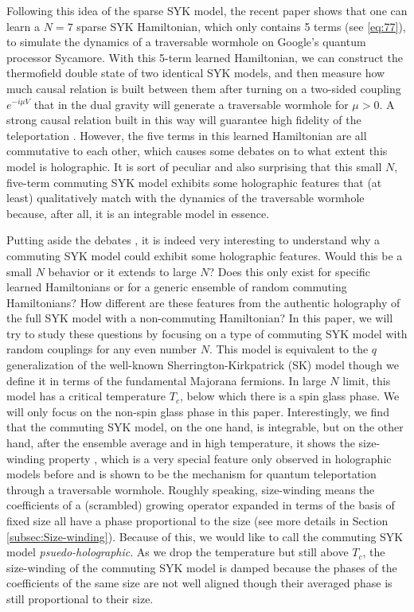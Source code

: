 \documentclass[11pt]{article}
\renewcommand{\>}{\rangle}
\newcommand{\<}{\langle}
\begin{document}
Following this idea of the sparse SYK model, the recent paper \cite{Jafferis:2022crx} shows that one can learn a $N=7$ sparse SYK Hamiltonian, which only contains 5 terms (see \eqref{eq:77}), to simulate the dynamics of a traversable wormhole on Google's quantum processor Sycamore. With this 5-term learned Hamiltonian, we can construct the thermofield double state of two identical SYK models, and then measure how much causal relation is built between them after turning on a two-sided coupling $e^{-i\mu V}$ that in the dual gravity will generate a traversable wormhole for $\mu>0$. A strong causal relation built in this way will guarantee high fidelity of the teleportation \cite{Gao:2019nyj}. However, the five terms in this learned Hamiltonian are all commutative to each other, which causes some debates \cite{Kobrin:2023rzr,Jafferis:2023moh} on to what extent this model is holographic. It is sort of peculiar and also surprising that this small $N$, five-term commuting SYK model exhibits some holographic features that (at least) qualitatively match with the dynamics of the traversable wormhole because, after all, it is an integrable model in essence.

Putting aside the debates \cite{Kobrin:2023rzr,Jafferis:2023moh}, it is indeed very interesting to understand why a commuting SYK model could exhibit some holographic features. Would this be a small $N$ behavior or it extends to large $N$? Does this only exist for specific learned Hamiltonians or for a generic ensemble of random commuting Hamiltonians? How different are these features from the authentic holography of the full SYK model with a non-commuting Hamiltonian? In this paper, we will try to study these questions by focusing on a type of commuting SYK model with random couplings for any even number $N$. This model is equivalent to the $q$ generalization of the well-known Sherrington-Kirkpatrick (SK) model \cite{sherrington1975solvable, thouless1977solution, parisi1979infinite} though we define it in terms of the fundamental Majorana fermions. In large $N$ limit, this model has a critical temperature $T_c$, below which there is a spin glass phase. We will only focus on the non-spin glass phase in this paper. Interestingly, we find that the commuting SYK model, on the one hand, is integrable, but on the other hand, after the ensemble average and in high temperature, it shows the size-winding property \cite{Brown:2019hmk,Nezami:2021yaq}, which is a very special feature only observed in holographic models before and is shown to be the mechanism for quantum teleportation through a traversable wormhole. Roughly speaking, size-winding means the coefficients of a (scrambled) growing operator expanded in terms of the basis of fixed size all have a phase proportional to the size (see more details in Section \ref{subsec:Size-winding}). Because of this, we would like to call the commuting SYK model {\it psuedo-holographic}. As we drop the temperature but still above $T_c$, the size-winding of the commuting SYK model is damped because the phases of the coefficients of the same size are not well aligned though their averaged phase is still proportional to their size.
\end{document}
